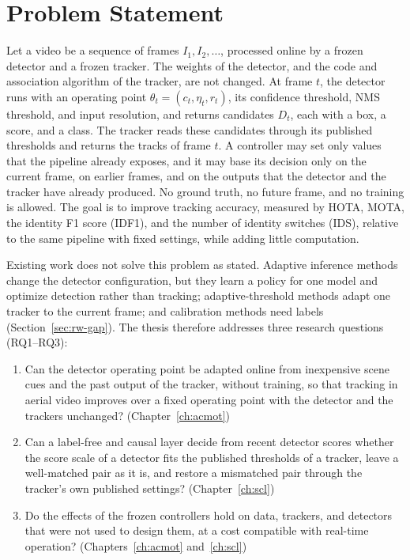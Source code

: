 \section{Problem Statement}\label{sec:intro-problem}
Let a video be a sequence of frames $I_1, I_2, \dots$, processed online by a frozen detector and a frozen tracker. The weights of the detector, and the code and association algorithm of the tracker, are not changed. At frame $t$, the detector runs with an operating point $\theta_t=(c_t,\eta_t,r_t)$, its confidence threshold, NMS threshold, and input resolution, and returns candidates $D_t$, each with a box, a score, and a class. The tracker reads these candidates through its published thresholds and returns the tracks of frame $t$. A controller may set only values that the pipeline already exposes, and it may base its decision only on the current frame, on earlier frames, and on the outputs that the detector and the tracker have already produced. No ground truth, no future frame, and no training is allowed. The goal is to improve tracking accuracy, measured by HOTA, MOTA, the identity F1 score (IDF1), and the number of identity switches (IDS), relative to the same pipeline with fixed settings, while adding little computation.

Existing work does not solve this problem as stated. Adaptive inference methods change the detector configuration, but they learn a policy for one model and optimize detection rather than tracking; adaptive-threshold methods adapt one tracker to the current frame; and calibration methods need labels (Section~\ref{sec:rw-gap}). The thesis therefore addresses three research questions (RQ1--RQ3):
\begin{enumerate}
\item[\textbf{RQ1}] Can the detector operating point be adapted online from inexpensive scene cues and the past output of the tracker, without training, so that tracking in aerial video improves over a fixed operating point with the detector and the trackers unchanged? (Chapter~\ref{ch:acmot})
\item[\textbf{RQ2}] Can a label-free and causal layer decide from recent detector scores whether the score scale of a detector fits the published thresholds of a tracker, leave a well-matched pair as it is, and restore a mismatched pair through the tracker's own published settings? (Chapter~\ref{ch:scl})
\item[\textbf{RQ3}] Do the effects of the frozen controllers hold on data, trackers, and detectors that were not used to design them, at a cost compatible with real-time operation? (Chapters~\ref{ch:acmot} and~\ref{ch:scl})
\end{enumerate}

